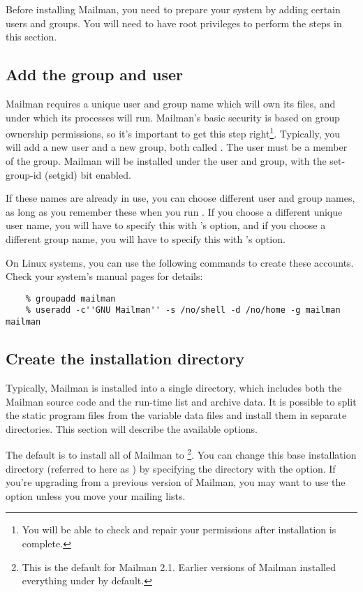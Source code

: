 \documentclass{howto}
\begin{document}
Before installing Mailman, you need to prepare your system by adding certain
users and groups.  You will need to have root privileges to perform the steps
in this section.

\subsection{Add the group and user}

Mailman requires a unique user and group name which will own its files, and
under which its processes will run.  Mailman's basic security is based on
group ownership permissions, so it's important to get this step
right\footnote{You will be able to check and repair your permissions after
installation is complete.}.  Typically, you will add a new user and a new
group, both called .  The  user must be a member
of the  group.  Mailman will be installed under the
 user and group, with the set-group-id (setgid) bit enabled.

If these names are already in use, you can choose different user and group
names, as long as you remember these when you run .  If you
choose a different unique user name, you will have to specify this with
's  option, and if you choose
a different group name, you will have to specify this with
's  option.

On Linux systems, you can use the following commands to create these
accounts.  Check your system's manual pages for details:

\begin{verbatim}
    % groupadd mailman
    % useradd -c''GNU Mailman'' -s /no/shell -d /no/home -g mailman mailman
\end{verbatim}

\subsection{Create the installation directory\label{create-install-dir}}
Typically, Mailman is installed into a single directory, which includes both
the Mailman source code and the run-time list and archive data.  It is
possible to split the static program files from the variable data files and
install them in separate directories.  This section will describe the
available options.

The default is to install all of Mailman to
\footnote{This is the default for Mailman 2.1.
Earlier versions of Mailman installed everything under  by
default.}.  You can change this base installation directory (referred to here
as ) by specifying the directory with the
  option.  If you're upgrading from
a previous version of Mailman, you may want to use the 
option unless you move your mailing lists.
\end{document}
